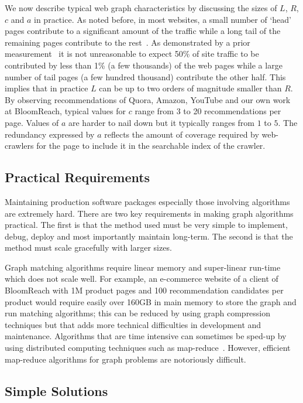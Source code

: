 We now describe typical web graph characteristics by discussing the
sizes of $L$, $R$, $c$ and $a$ in practice. As noted before, in most
websites, a small number of `head' pages contribute to a significant
amount of the traffic while a long tail of the remaining pages
contribute to the rest~\cite{HubermanAdamic1999,
  DuDemmerBrewer2006}. As demonstrated by a prior
measurement~\cite{KumarNorrisSun2009} it is not unreasonable to expect
50\% of site traffic to be contributed by less than 1\% (a few
thousands) of the web pages while a large number of tail pages (a few
hundred thousand) contribute the other half. This implies that in
practice $L$ can be up to two orders of magnitude smaller than $R$.
By observing recommendations of Quora, Amazon, YouTube and our own
work at BloomReach, typical values for $c$ range from 3 to 20
recommendations per page. Values of $a$ are harder to nail down but it
typically ranges from $1$ to $5$. The redundancy expressed by $a$
reflects the amount of coverage required by web-crawlers for the page
to include it in the searchable index of the crawler.  \vs

\subsection{Practical Requirements}

Maintaining production software packages especially those involving algorithms
are extremely hard. There are two key requirements in making graph algorithms
practical. The first is that the method used must be very simple to
implement, debug, deploy and most importantly maintain long-term. The second is that the method must scale
gracefully with larger sizes. \vs

Graph matching algorithms require linear memory and super-linear run-time
which does not scale well. For example, an e-commerce website of a
client of BloomReach with 1M product pages and 100 recommendation
candidates per product would require easily over 160GB in main memory to store the graph
and run matching algorithms; this can be reduced by using graph
compression techniques but that adds more technical difficulties in
development and maintenance. Algorithms that are time intensive
can sometimes be sped-up by using distributed computing techniques such as
map-reduce~\cite{DeanGhemawat2004}. However, efficient map-reduce
algorithms for graph problems are notoriously difficult. \vs

\subsection{Simple Solutions}

